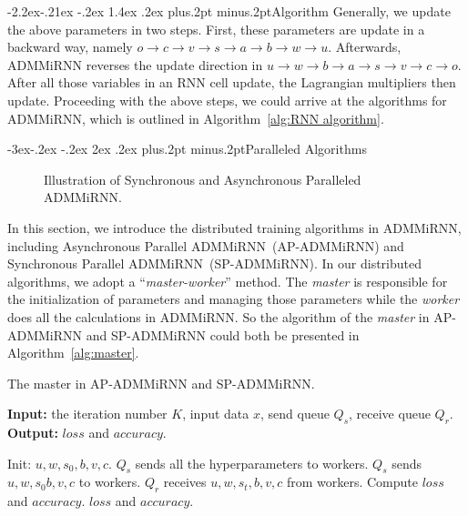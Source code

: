 \documentclass[twoside]{article}
\makeatletter
\def\subsection{\@startsection{subsection}{2}{\z@}%
 {-3ex\@plus -.2ex \@minus -.2ex}%
 {2ex \@plus.2ex}%
{\normalfont\normalsize\protect\baselineskip=12.5pt plus.2pt minus.2pt\bfseries}}
\def\subsubsection{\@startsection{subsubsection}{3}{\z@}%
 {-2.2ex\@plus -.21ex \@minus -.2ex}%
 {1.4ex \@plus.2ex}
{\normalfont\normalsize\protect\baselineskip=12pt plus.2pt minus.2pt\sl}}
\makeatother
\begin{document}
\begin{multicols}{2}
\subsubsection{Algorithm}
Generally, we update the above parameters in two steps.
First, these parameters are update in a backward way, namely $o\rightarrow c \rightarrow v \rightarrow s \rightarrow a \rightarrow b \rightarrow w \rightarrow u$.
Afterwards, ADMMiRNN reverses the update direction in $u\rightarrow w \rightarrow b \rightarrow a \rightarrow s \rightarrow v \rightarrow c \rightarrow o$.
After all those variables in an RNN cell update, the Lagrangian multipliers then update. Proceeding with the above steps, we could arrive at the algorithms for ADMMiRNN, which is outlined in Algorithm~\ref{alg:RNN algorithm}.


\subsection{Paralleled Algorithms}\label{sec:paralleled algorithms}


\begin{figure}[tbp]
\centering
{}
\caption{Illustration of Synchronous and Asynchronous Paralleled ADMMiRNN.}\label{fig:sync and async}
\end{figure}

In this section, we introduce the distributed training algorithms in ADMMiRNN, including Asynchronous Parallel ADMMiRNN~(AP-ADMMiRNN) and Synchronous Parallel ADMMiRNN~(SP-ADMMiRNN). 
In our distributed algorithms, we adopt a ``\textit{master-worker}'' method. The \textit{master} is responsible for the initialization of parameters and managing those parameters while the \textit{worker} does all the calculations in ADMMiRNN. So the algorithm of the \textit{master} in AP-ADMMiRNN and SP-ADMMiRNN could both be presented in Algorithm~\ref{alg:master}.  
\begin{algorithm}[H]
\caption{The master in AP-ADMMiRNN and SP-ADMMiRNN.} \label{alg:master}
\hspace*{0.02in} 
\textbf{Input:} the iteration number $K$, input data $x$, send queue $Q_s$, receive queue $Q_r$. \\
\hspace*{0.02in}  
\textbf{Output:} $loss$ and $accuracy$.\\
\begin{algorithmic}[1]
\STATE Init: $u, w, s_0, b, v, c$.
\STATE $Q_s$ sends all the hyperparameters to workers.
	\STATE $Q_s$ sends $u, w, s_0 b, v, c$ to workers.
	\STATE $Q_r$ receives $u, w, s_{t}, b, v, c$ from workers.
	\STATE Compute $loss$ and $accuracy$.
\ENDFOR
\RETURN $loss$ and $accuracy$.
\end{algorithmic}
\end{algorithm}


\end{multicols}
\end{document}
